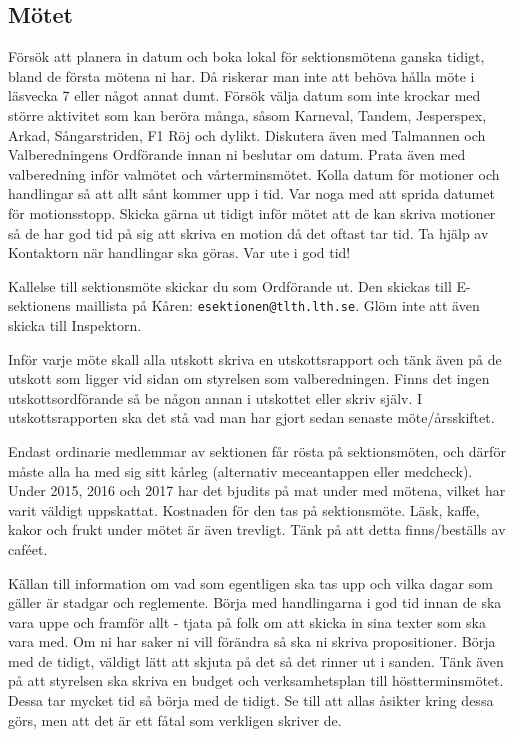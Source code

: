 \documentclass[10pt]{article}
\begin{document}
\subsection{Mötet}

Försök att planera in datum och boka lokal för sektionsmötena ganska tidigt, bland de första mötena ni har. Då riskerar man inte att behöva hålla möte i läsvecka 7 eller något annat dumt. Försök välja datum som inte krockar med större aktivitet som kan beröra många, såsom Karneval, Tandem, Jesperspex, Arkad, Sångarstriden, F1 Röj och dylikt. Diskutera även med Talmannen och Valberedningens Ordförande innan ni beslutar om datum. Prata även med valberedning inför valmötet och vårterminsmötet. Kolla datum för motioner och handlingar så att allt sånt kommer upp i tid. Var noga med att sprida datumet för motionsstopp. Skicka gärna ut tidigt inför mötet att de kan skriva motioner så de har god tid på sig att skriva en motion då det oftast tar tid. Ta hjälp av Kontaktorn när handlingar ska göras. Var ute i god tid!

Kallelse till sektionsmöte skickar du som Ordförande ut. Den skickas till E-sektionens maillista på Kåren: \texttt{esektionen@tlth.lth.se}. Glöm inte att även skicka till Inspektorn.

Inför varje möte skall alla utskott skriva en utskottsrapport och tänk även på de utskott som ligger vid sidan om styrelsen som valberedningen. Finns det ingen utskottsordförande så be någon annan i utskottet eller skriv själv. I utskottsrapporten ska det stå vad man har gjort sedan senaste möte/årsskiftet.

Endast ordinarie medlemmar av sektionen får rösta på sektionsmöten, och därför måste alla ha med sig sitt kårleg (alternativ meceantappen eller medcheck). Under 2015, 2016 och 2017 har det bjudits på mat under med mötena, vilket har varit väldigt uppskattat. Kostnaden för den tas på sektionsmöte. Läsk, kaffe, kakor och frukt under mötet är även trevligt. Tänk på att detta finns/beställs av caféet.

Källan till information om vad som egentligen ska tas upp och vilka dagar som gäller är stadgar och reglemente. Börja med handlingarna i god tid innan de ska vara uppe och framför allt - tjata på folk om att skicka in sina texter som ska vara med. Om ni har saker ni vill förändra så ska ni skriva propositioner. Börja med de tidigt, väldigt lätt att skjuta på det så det rinner ut i sanden. Tänk även på att styrelsen ska skriva en budget och verksamhetsplan till höstterminsmötet. Dessa tar mycket tid så börja med de tidigt. Se till att allas åsikter kring dessa görs, men att det är ett fåtal som verkligen skriver de.
\end{document}
